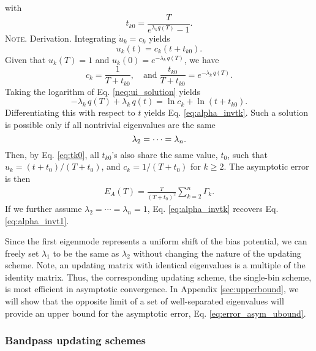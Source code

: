 \documentclass[reprint, superscriptaddress, floatfix]{revtex4-1}
\newcommand{\note}[1]{{\color{DarkGreen}\footnotesize \textsc{Note.} #1}}
\newcommand{\Err}{E}
\begin{document}
with
\begin{equation}
  t_{k0} = \frac{             T            }
                { e^{ \lambda_k q(T) } - 1 }.
\label{eq:tk0}
\end{equation}
%
\note{Derivation.
  Integrating $\dot u_k = c_k$ yields
  \begin{equation}
    u_k(t) = c_k \left(t + t_{k0} \right).
  \tag{UK}
  \label{neq:ui_solution}
  \end{equation}
  Given that $u_k(T) = 1$ and $u_k(0) = e^{-\lambda_k \, q(T)}$,
  we have
  $$
  c_k = \frac{ 1 }{ T + t_{k0} },
  \quad
  \mathrm{and\;}
  \frac{ t_{k0} } { T + t_{k0} }
  =
  e^{ -\lambda_k \, q(T) }.
  $$
  Taking the logarithm of Eq. \eqref{neq:ui_solution} yields
  $$
  -\lambda_k \, q(T) + \lambda_k \, q(t)
  = \ln c_k + \ln \left( t + t_{k0} \right).
  $$
  Differentiating this with respect to $t$ yields
  Eq. \eqref{eq:alpha_invtk}.
}
%
Such a solution is possible only if
all nontrivial eigenvalues are the same
%
\begin{equation}
  \lambda_2 = \dots = \lambda_n.
  \notag
\end{equation}
%
Then, by Eq. \eqref{eq:tk0},
all $t_{k0}$'s also share the same value,
$t_0$,
such that
$u_k = (t + t_0) / (T + t_0)$,
and
$c_k = 1/(T + t_0)$
for $k \ge 2$.
%
The asymptotic error is then
%
\begin{align}
  \Err_A(T)
  =
  \frac{       T     }
       { (T + t_0)^2 }
  \sum_{ k = 2 }^n
    \Gamma_k
  .
\label{eq:error_asym_singlebin}
\end{align}
%
If we further assume $\lambda_2 = \cdots = \lambda_n = 1$,
Eq. \eqref{eq:alpha_invtk}
recovers Eq. \eqref{eq:alpha_invt1}.
%

Since the first eigenmode represents
a uniform shift of the bias potential,
we can freely set $\lambda_1$ to be the same as $\lambda_2$
without changing the nature of the updating scheme.
%
Note, an updating matrix
with identical eigenvalues
is a multiple of the identity matrix.
%
Thus,
the corresponding updating scheme,
the single-bin scheme, is most efficient
in asymptotic convergence.
%
In Appendix \ref{sec:upperbound},
we will show that the opposite limit of
a set of well-separated eigenvalues
will provide an upper bound for
the asymptotic error, Eq. \eqref{eq:error_asym_ubound}.



\subsubsection{\label{sec:optscheme}
Bandpass updating schemes}
\end{document}
